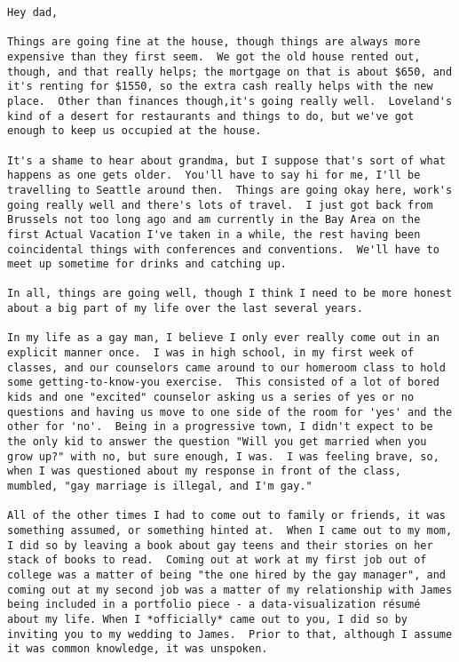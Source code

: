 \begin{verbatim}
Hey dad,

Things are going fine at the house, though things are always more expensive than they first seem.  We got the old house rented out, though, and that really helps; the mortgage on that is about $650, and it's renting for $1550, so the extra cash really helps with the new place.  Other than finances though,it's going really well.  Loveland's kind of a desert for restaurants and things to do, but we've got enough to keep us occupied at the house.

It's a shame to hear about grandma, but I suppose that's sort of what happens as one gets older.  You'll have to say hi for me, I'll be travelling to Seattle around then.  Things are going okay here, work's going really well and there's lots of travel.  I just got back from Brussels not too long ago and am currently in the Bay Area on the first Actual Vacation I've taken in a while, the rest having been coincidental things with conferences and conventions.  We'll have to meet up sometime for drinks and catching up.

In all, things are going well, though I think I need to be more honest about a big part of my life over the last several years.

In my life as a gay man, I believe I only ever really come out in an explicit manner once.  I was in high school, in my first week of classes, and our counselors came around to our homeroom class to hold some getting-to-know-you exercise.  This consisted of a lot of bored kids and one "excited" counselor asking us a series of yes or no questions and having us move to one side of the room for 'yes' and the other for 'no'.  Being in a progressive town, I didn't expect to be the only kid to answer the question "Will you get married when you grow up?" with no, but sure enough, I was.  I was feeling brave, so, when I was questioned about my response in front of the class, mumbled, "gay marriage is illegal, and I'm gay."

All of the other times I had to come out to family or friends, it was something assumed, or something hinted at.  When I came out to my mom, I did so by leaving a book about gay teens and their stories on her stack of books to read.  Coming out at work at my first job out of college was a matter of being "the one hired by the gay manager", and coming out at my second job was a matter of my relationship with James being included in a portfolio piece - a data-visualization résumé about my life. When I *officially* came out to you, I did so by inviting you to my wedding to James.  Prior to that, although I assume it was common knowledge, it was unspoken.


\end{verbatim}
